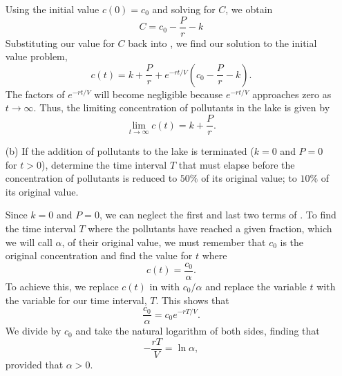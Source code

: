 \begin{ex}
\begin{enumerate}
\begin{sol}
          Using the initial value $c(0)=c_0$ and solving for $C$, we obtain
          \begin{equation}
            C=c_0 -\frac{P}{r}-k
            \label{csol}
          \end{equation}
          Substituting our value for $C$ back into , we find our solution to the initial value problem,
          \begin{equation}
            c(t)=k+\frac{P}{r}+e^{-rt/V}\left( c_0 - \frac{P}{r} -k\right).
            \label{ctbig}
          \end{equation}
          The factors of $e^{-rt/V}$
          will become negligible because $e^{-rt/V}$ approaches zero as $t\to\infty$.
          Thus, the limiting concentration of pollutants in the lake is given by
          \begin{equation}
            \lim_{t\to\infty} c(t) = k+\frac{P}{r}.
            \label{limc}
          \end{equation}
       \end{sol}
      \item[(b)]
        If the addition of pollutants to the lake is terminated ($k=0$ and $P=0$ for $t>0$),
        determine the time interval $T$ that must elapse before the concentration of pollutants is reduced to $50\%$ of its original value;
        to $10\%$ of its original value.

        \begin{sol}
          Since $k=0$ and $P=0$, we can neglect the first and last two terms of .
          To find the time interval $T$ where the pollutants have reached a given fraction, which we will call $\alpha$, of their original value,
          we must remember that $c_0$ is the original concentration and find the value for $t$ where
          \begin{equation}
            c(t) = \frac{c_0}{\alpha}.
            \label{halfc}
          \end{equation}
          To achieve this, we replace $c(t)$ in  with $c_0/\alpha$ and replace the variable $t$ with the variable for our time interval, $T$.
          This shows that
          \begin{equation}
            \frac{c_0}{\alpha}=c_0 e^{-rT/V}.
            \label{halfceq}
          \end{equation}
          We divide by $c_0$ and take the natural logarithm of both sides, finding that
          \begin{equation}
            -\frac{rT}{V}=\ln{\alpha},
            \label{Tnlog}
          \end{equation}
          provided that $\alpha > 0$.


\end{sol}
\end{enumerate}
\end{ex}
